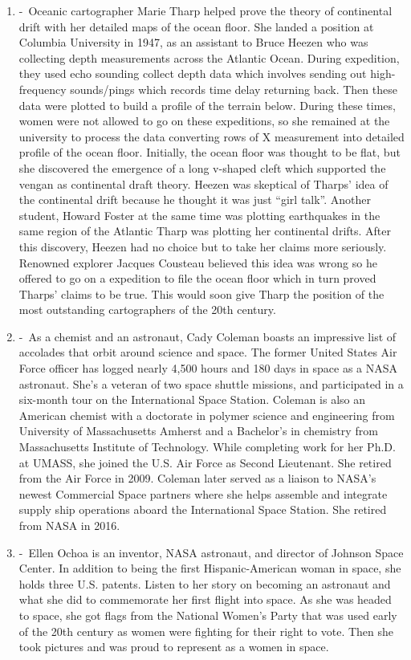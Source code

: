 \documentclass[12pt,a4paper]{article}
\begin{document}
\begin{enumerate}
    \item {} -\ Oceanic cartographer Marie Tharp helped prove the theory of continental drift with her detailed maps of the ocean floor. She landed a position at Columbia University in 1947, as an assistant to Bruce Heezen who was collecting depth measurements across the Atlantic Ocean. During expedition, they used echo sounding collect depth data which involves sending out high-frequency sounds/pings which records time delay returning back. Then these data were plotted to build a profile of the terrain below. During these times, women were not allowed to go on these expeditions, so she remained at the university to process the data converting rows of X measurement into detailed profile of the ocean floor. Initially, the ocean floor was thought to be flat, but she discovered the emergence of a long v-shaped cleft which supported the vengan as continental draft theory. Heezen was skeptical of Tharps' idea of the continental drift because he thought it was just ``girl talk''. Another student, Howard Foster at the same time was plotting earthquakes in the same region of the Atlantic Tharp was plotting her continental drifts. After this discovery, Heezen had no choice but to take her claims more seriously. Renowned explorer Jacques Cousteau believed this idea was wrong so he offered to go on a expedition to file the ocean floor which in turn proved Tharps' claims to be true. This would soon give Tharp the position of the most outstanding cartographers of the 20th century.
    \item {} -\ As a chemist and an astronaut, Cady Coleman boasts an impressive list of accolades that orbit around science and space. The former United States Air Force officer has logged nearly 4,500 hours and 180 days in space as a NASA astronaut. She's a veteran of two space shuttle missions, and participated in a six-month tour on the International Space Station. Coleman is also an American chemist with a doctorate in polymer science and engineering from University of Massachusetts Amherst and a Bachelor's in chemistry from Massachusetts Institute of Technology. While completing work for her Ph.D. at UMASS, she joined the U.S. Air Force as Second Lieutenant. She retired from the Air Force in 2009. Coleman later served as a liaison to NASA's newest Commercial Space partners where she helps assemble and integrate supply ship operations aboard the International Space Station. She retired from NASA in 2016.
    \item {} -\ Ellen Ochoa is an inventor, NASA astronaut, and director of Johnson Space Center. In addition to being the first Hispanic-American woman in space, she holds three U.S. patents. Listen to her story on becoming an astronaut and what she did to commemorate her first flight into space. As she was headed to space, she got flags from the National Women's Party that was used early of the 20th century as women were fighting for their right to vote. Then she took pictures and was proud to represent as a women in space.

\end{enumerate}
\end{document}
